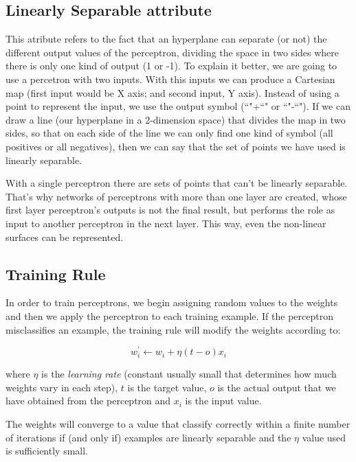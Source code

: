 	\subsection{Linearly Separable attribute}
	This atribute refers to the fact that an hyperplane can separate (or not) the different output values of the perceptron, dividing the space in two sides where there is only one kind of output (1 or -1). To explain it better, we are going to use a percetron with two inputs. With this inputs we can produce a Cartesian map (first input would be X axis; and second input, Y axis). Instead of using a point to represent the input, we use the output symbol (``"+``" or ``"-``"). If we can draw a line (our hyperplane in a 2-dimension space) that divides the map in two sides, so that on each side of the line we can only find one kind of symbol (all positives or all negatives), then we can say that the set of points we have used is linearly separable.  
	
	With a single perceptron there are sets of points that can't be linearly separable. That's why networks of perceptrons with more than one layer are created, whose first layer perceptron's outputs is not the final result, but performs the role as input to another perceptron in the next layer. This way, even the non-linear surfaces can be represented.

	\subsection{Training Rule}
	In order to train perceptrons, we begin assigning random values to the weights and then we apply the perceptron to each training example. If the perceptron misclassifies an example, the training rule will modify the weights according to:

	\begin{equation}
		\label{training_rule}
		w_{i}^{'} \leftarrow w_{i} + \eta (t - o) x_{i}
	\end{equation}

	where $\eta$ is the \textit{learning rate} (constant usually small that determines how much weights vary in each step), $t$ is the target value, $o$ is the actual output that we have obtained from the perceptron and $x_{i}$ is the input value.

	The weights will converge to a value that classify correctly within a finite number of iterations if (and only if) examples are linearly separable and the $\eta$ value used is sufficiently small.
	
